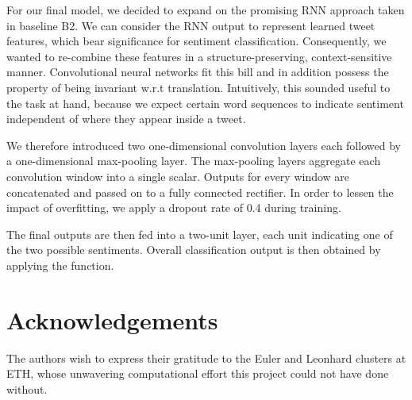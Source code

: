 \documentclass[10pt,conference,compsocconf]{IEEEtran}
\begin{document}
For our final model, we decided to expand on the promising RNN
approach taken in baseline B2. We can consider the RNN output to
represent learned tweet features, which bear significance for
sentiment classification. Consequently, we wanted to re-combine these
features in a structure-preserving, context-sensitive
manner. Convolutional neural networks fit this bill and in addition
possess the property of being invariant w.r.t
translation. Intuitively, this sounded useful to the task at hand,
because we expect certain word sequences to indicate sentiment
independent of where they appear inside a tweet.

We therefore introduced two one-dimensional convolution layers each
followed by a one-dimensional max-pooling layer. The max-pooling
layers aggregate each convolution window into a single scalar. Outputs
for every window are concatenated and passed on to a fully connected
rectifier. In order to lessen the impact of overfitting, we apply a
dropout rate of 0.4 during training.

The final outputs are then fed into a two-unit layer, each unit
indicating one of the two possible sentiments. Overall classification
output is then obtained by applying the  function.

\section*{Acknowledgements}

The authors wish to express their gratitude to the Euler and Leonhard
clusters at ETH, whose unwavering computational effort this project
could not have done without.



\end{document}
